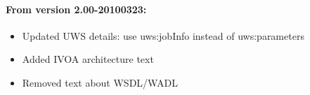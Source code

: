 \documentclass[11pt,a4paper]{ivoa}
\begin{document}
\paragraph{From version 2.00-20100323:}
\begin{itemize}
    \item Updated UWS details: use uws:jobInfo instead of uws:parameters
    \item Added IVOA architecture text
    \item Removed text about WSDL/WADL
\end{itemize}


\end{document}
